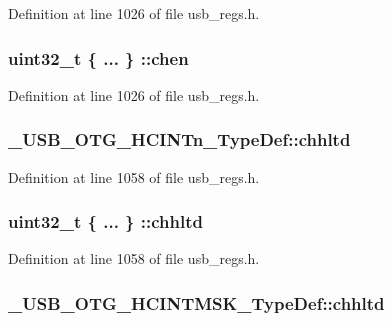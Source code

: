 Definition at line 1026 of file usb\-\_\-regs.\-h.

\hypertarget{group___u_s_b___o_t_g___d_r_i_v_e_r_ga50f2614b2e6ec928eba7cdb919919fd2}{
\subsubsection[{chen}]{\setlength{\rightskip}{0pt plus 5cm}uint32\-\_\-t \{ ... \} \-::chen}}\label{group___u_s_b___o_t_g___d_r_i_v_e_r_ga50f2614b2e6ec928eba7cdb919919fd2}


Definition at line 1026 of file usb\-\_\-regs.\-h.

\hypertarget{group___u_s_b___o_t_g___d_r_i_v_e_r_gac58dedceee6dd7ac490b3c43823f1bc9}{
\subsubsection[{chhltd}]{ \-\_\-\-U\-S\-B\-\_\-\-O\-T\-G\-\_\-\-H\-C\-I\-N\-Tn\-\_\-\-Type\-Def\-::chhltd}}\label{group___u_s_b___o_t_g___d_r_i_v_e_r_gac58dedceee6dd7ac490b3c43823f1bc9}


Definition at line 1058 of file usb\-\_\-regs.\-h.

\hypertarget{group___u_s_b___o_t_g___d_r_i_v_e_r_ga352a0f6ab2ec513c977d2c35fe8c27a3}{
\subsubsection[{chhltd}]{\setlength{\rightskip}{0pt plus 5cm}uint32\-\_\-t \{ ... \} \-::chhltd}}\label{group___u_s_b___o_t_g___d_r_i_v_e_r_ga352a0f6ab2ec513c977d2c35fe8c27a3}


Definition at line 1058 of file usb\-\_\-regs.\-h.

\hypertarget{group___u_s_b___o_t_g___d_r_i_v_e_r_ga520845ff45958d50ae4a81157db6e4d4}{
\subsubsection[{chhltd}]{ \-\_\-\-U\-S\-B\-\_\-\-O\-T\-G\-\_\-\-H\-C\-I\-N\-T\-M\-S\-K\-\_\-\-Type\-Def\-::chhltd}}\label{group___u_s_b___o_t_g___d_r_i_v_e_r_ga520845ff45958d50ae4a81157db6e4d4}


